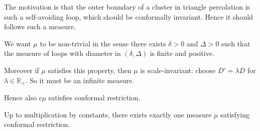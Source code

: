 \documentclass[12pt]{article}
\begin{document}
The motivation is that the outer boundary of a cluster in triangle percolation is such a self-avoiding loop, which should be conformally invariant. Hence it should follows such a measure.

\begin{remark}
	We want $\mu$ to be non-trivial in the sense there exists $\delta > 0$ and $\Delta > 0$ such that the measure of loops with diameter in $(\delta, \Delta)$ is finite and positive.

	Moreover if $\mu$ satisfies this property, then $\mu$ is scale-invariant: choose $D' = \lambda D$ for $\lambda \in \mathbb{R}_+$. So it must be an infinite measure.

	Hence also $c \mu$ satisfies conformal restriction.
\end{remark}

\begin{theorem}
	Up to multiplication by constants, there exists exactly one measure $\mu$ satisfying conformal restriction.
\end{theorem}
\end{document}
